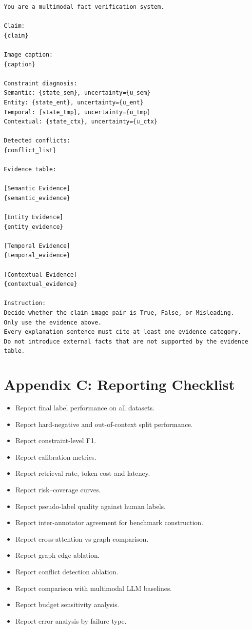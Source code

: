 \documentclass[11pt,a4paper]{article}
\begin{document}
\begin{verbatim}
You are a multimodal fact verification system.

Claim:
{claim}

Image caption:
{caption}

Constraint diagnosis:
Semantic: {state_sem}, uncertainty={u_sem}
Entity: {state_ent}, uncertainty={u_ent}
Temporal: {state_tmp}, uncertainty={u_tmp}
Contextual: {state_ctx}, uncertainty={u_ctx}

Detected conflicts:
{conflict_list}

Evidence table:

[Semantic Evidence]
{semantic_evidence}

[Entity Evidence]
{entity_evidence}

[Temporal Evidence]
{temporal_evidence}

[Contextual Evidence]
{contextual_evidence}

Instruction:
Decide whether the claim-image pair is True, False, or Misleading.
Only use the evidence above.
Every explanation sentence must cite at least one evidence category.
Do not introduce external facts that are not supported by the evidence table.
\end{verbatim}

\section{Appendix C: Reporting Checklist}

\begin{itemize}[leftmargin=1.5em]
\item Report final label performance on all datasets.
\item Report hard-negative and out-of-context split performance.
\item Report constraint-level F1.
\item Report calibration metrics.
\item Report retrieval rate, token cost and latency.
\item Report risk--coverage curves.
\item Report pseudo-label quality against human labels.
\item Report inter-annotator agreement for benchmark construction.
\item Report cross-attention vs graph comparison.
\item Report graph edge ablation.
\item Report conflict detection ablation.
\item Report comparison with multimodal LLM baselines.
\item Report budget sensitivity analysis.
\item Report error analysis by failure type.
\end{itemize}
\end{document}
